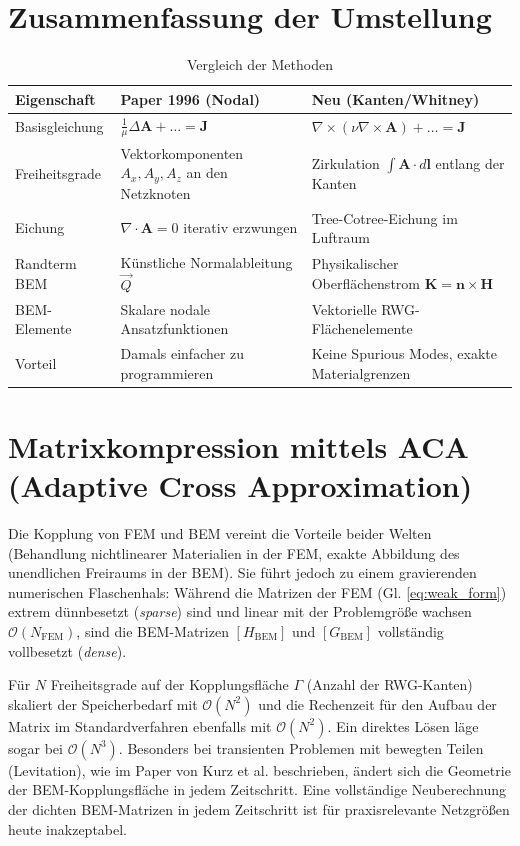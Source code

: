 \documentclass[11pt,a4paper]{article}
\newcommand{\vA}{\bm{A}}
\newcommand{\vH}{\bm{H}}
\newcommand{\vJ}{\bm{J}}
\newcommand{\vn}{\bm{n}}
\newcommand{\vK}{\bm{K}} %
\newcommand{\rot}{\nabla \times}
\renewcommand{\div}{\nabla \cdot}
\begin{document}
\section{Zusammenfassung der Umstellung}
\begin{table}[hbt!]
    \centering
    \begin{tabular}{|l|p{6cm}|p{6cm}|}
    \hline
    \textbf{Eigenschaft} & \textbf{Paper 1996 (Nodal)} & \textbf{Neu (Kanten/Whitney)} \\
    \hline
    Basisgleichung & $\frac{1}{\mu}\Delta \vA + \dots = \vJ$ & $\rot(\nu\rot\vA) + \dots = \vJ$ \\
    \hline
    Freiheitsgrade & Vektorkomponenten $A_x, A_y, A_z$ an den Netzknoten & Zirkulation $\int \vA \cdot d\bm{l}$ entlang der Kanten \\
    \hline
    Eichung & $\div \vA = 0$ iterativ erzwungen & Tree-Cotree-Eichung im Luftraum \\
    \hline
    Randterm BEM & Künstliche Normalableitung $\vec{Q}$ & Physikalischer Oberflächenstrom $\vK = \vn \times \vH$ \\
    \hline
    BEM-Elemente & Skalare nodale Ansatzfunktionen & Vektorielle RWG-Flächenelemente \\
    \hline
    Vorteil & Damals einfacher zu programmieren & Keine Spurious Modes, exakte Materialgrenzen \\
    \hline
    \end{tabular}
    \caption{Vergleich der Methoden}
\end{table}

\section{Matrixkompression mittels ACA (Adaptive Cross Approximation)}

Die Kopplung von FEM und BEM vereint die Vorteile beider Welten (Behandlung nichtlinearer Materialien in der FEM, exakte Abbildung des unendlichen Freiraums in der BEM). Sie führt jedoch zu einem gravierenden numerischen Flaschenhals: Während die Matrizen der FEM (Gl. \ref{eq:weak_form}) extrem dünnbesetzt (\textit{sparse}) sind und linear mit der Problemgröße wachsen $\mathcal{O}(N_{\text{FEM}})$, sind die BEM-Matrizen $[H_{\text{BEM}}]$ und $[G_{\text{BEM}}]$ vollständig vollbesetzt (\textit{dense}).

Für $N$ Freiheitsgrade auf der Kopplungsfläche $\Gamma$ (Anzahl der RWG-Kanten) skaliert der Speicherbedarf mit $\mathcal{O}(N^2)$ und die Rechenzeit für den Aufbau der Matrix im Standardverfahren ebenfalls mit $\mathcal{O}(N^2)$. Ein direktes Lösen läge sogar bei $\mathcal{O}(N^3)$. 
Besonders bei transienten Problemen mit bewegten Teilen (Levitation), wie im Paper von Kurz et al. beschrieben, ändert sich die Geometrie der BEM-Kopplungsfläche in jedem Zeitschritt. Eine vollständige Neuberechnung der dichten BEM-Matrizen in jedem Zeitschritt ist für praxisrelevante Netzgrößen heute inakzeptabel.
\end{document}
